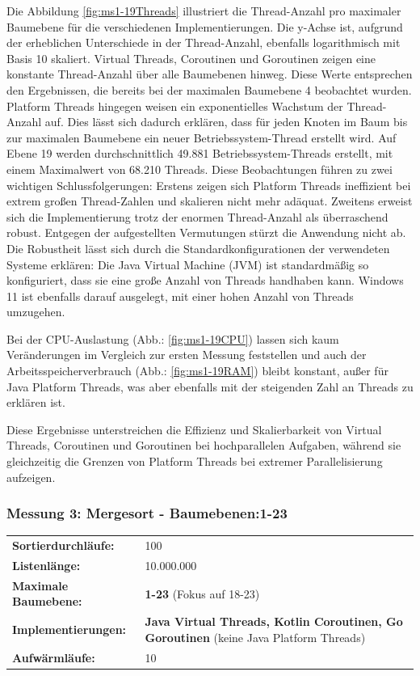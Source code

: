 \documentclass[fontsize=12pt,paper=a4,twoside=semi,parskip=half-,headsepline,headinclude]{scrreprt}
\begin{document}
Die Abbildung \ref{fig:ms1-19Threads} illustriert die Thread-Anzahl pro maximaler Baumebene für die verschiedenen Implementierungen. Die y-Achse ist, aufgrund der erheblichen Unterschiede in der Thread-Anzahl, ebenfalls logarithmisch mit Basis 10 skaliert. Virtual Threads, Coroutinen und Goroutinen zeigen eine konstante Thread-Anzahl über alle Baumebenen hinweg. Diese Werte entsprechen den Ergebnissen, die bereits bei der maximalen Baumebene 4 beobachtet wurden. Platform Threads hingegen weisen ein exponentielles Wachstum der Thread-Anzahl auf. Dies lässt sich dadurch erklären, dass für jeden Knoten im Baum bis zur maximalen Baumebene ein neuer Betriebssystem-Thread erstellt wird. Auf Ebene 19 werden durchschnittlich 49.881 Betriebssystem-Threads erstellt, mit einem Maximalwert von 68.210 Threads. Diese Beobachtungen führen zu zwei wichtigen Schlussfolgerungen: Erstens zeigen sich Platform Threads ineffizient bei extrem großen Thread-Zahlen und skalieren nicht mehr adäquat. Zweitens erweist sich die Implementierung trotz der enormen Thread-Anzahl als überraschend robust. Entgegen der aufgestellten Vermutungen stürzt die Anwendung nicht ab. Die Robustheit lässt sich durch die Standardkonfigurationen der verwendeten Systeme erklären: Die Java Virtual Machine (JVM) ist standardmäßig so konfiguriert, dass sie eine große Anzahl von Threads handhaben kann. Windows 11 ist ebenfalls darauf ausgelegt, mit einer hohen Anzahl von Threads umzugehen. 

Bei der CPU-Auslastung (Abb.: \ref{fig:ms1-19CPU}) lassen sich kaum Veränderungen im Vergleich zur ersten Messung feststellen und auch der Arbeitsspeicherverbrauch (Abb.: \ref{fig:ms1-19RAM}) bleibt konstant, außer für Java Platform Threads, was aber ebenfalls mit der steigenden Zahl an Threads zu erklären ist.

Diese Ergebnisse unterstreichen die Effizienz und Skalierbarkeit von Virtual Threads, Coroutinen und Goroutinen bei hochparallelen Aufgaben, während sie gleichzeitig die Grenzen von Platform Threads bei extremer Parallelisierung aufzeigen.

\subsubsection{Messung 3: Mergesort - Baumebenen:1-23}

\begin{tabularx}{\textwidth}{@{}lX@{}}
	\textbf{Sortierdurchläufe:} & 100 \\
	\textbf{Listenlänge:} & 10.000.000 \\
	\textbf{Maximale Baumebene:} & \textbf{1-23} (Fokus auf 18-23) \\
	\textbf{Implementierungen:} & \textbf{Java Virtual Threads, Kotlin Coroutinen, Go Goroutinen} (keine Java Platform Threads) \\
	\textbf{Aufwärmläufe:} & 10
\end{tabularx}
\end{document}
